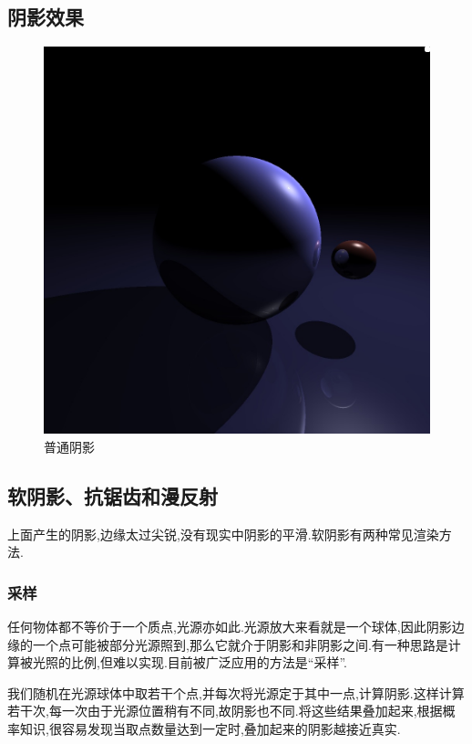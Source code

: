 \documentclass[10pt,twocolumn]{article}
\begin{document}
\subsection{\hei 阴影效果}
\begin{figure}[ht]
\centering
\includegraphics[scale=.2]{fig5.jpg}
\caption{普通阴影}
\end{figure}

\newpage

\subsection{\hei 软阴影、抗锯齿和漫反射}
上面产生的阴影,边缘太过尖锐,没有现实中阴影的平滑.软阴影有两种常见渲染方法.
\subsubsection{\hei 采样}
任何物体都不等价于一个质点,光源亦如此.光源放大来看就是一个球体,因此阴影边缘的一个点可能被部分光源照到,那么它就介于阴影和非阴影之间.有一种思路是计算被光照的比例,但难以实现.目前被广泛应用的方法是“采样”.

我们随机在光源球体中取若干个点,并每次将光源定于其中一点,计算阴影.这样计算若干次,每一次由于光源位置稍有不同,故阴影也不同.将这些结果叠加起来,根据概率知识,很容易发现当取点数量达到一定时,叠加起来的阴影越接近真实.
\end{document}
